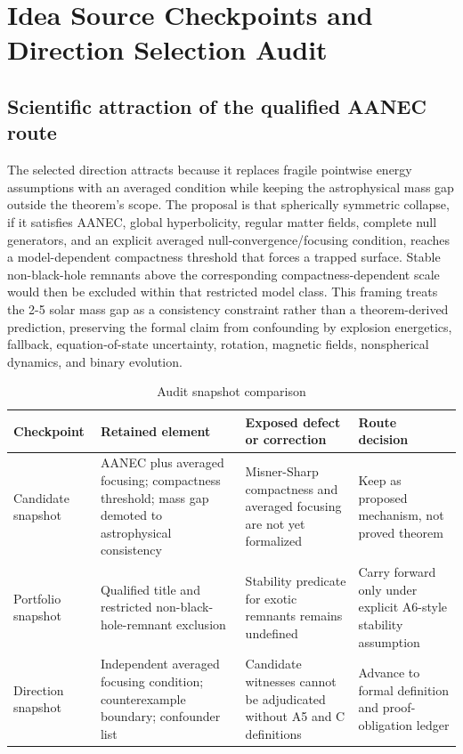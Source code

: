 \documentclass[conference]{IEEEtran}
\begin{document}
\section{Idea Source Checkpoints and Direction Selection Audit}
\subsection{Scientific attraction of the qualified AANEC route}
The selected direction attracts because it replaces fragile pointwise energy assumptions with an averaged condition while keeping the astrophysical mass gap outside the theorem’s scope. The proposal is that spherically symmetric collapse, if it satisfies AANEC, global hyperbolicity, regular matter fields, complete null generators, and an explicit averaged null-convergence/focusing condition, reaches a model-dependent compactness threshold that forces a trapped surface. Stable non-black-hole remnants above the corresponding compactness-dependent scale would then be excluded within that restricted model class. This framing treats the 2-5 solar mass gap as a consistency constraint rather than a theorem-derived prediction, preserving the formal claim from confounding by explosion energetics, fallback, equation-of-state uncertainty, rotation, magnetic fields, nonspherical dynamics, and binary evolution.

\begin{table}[htbp]
\centering
\footnotesize
\setlength{\tabcolsep}{3pt}
\renewcommand{\arraystretch}{1.12}
\caption{Audit snapshot comparison}
\label{tab:idea-origin-and-selection-checkpoint-audit-table}
\begin{tabular}{|p{}|p{}|p{}|p{}|}
\hline
Checkpoint & Retained element & Exposed defect or correction & Route decision \\\hline
Candidate snapshot & AANEC plus averaged focusing; compactness threshold; mass gap demoted to astrophysical consistency & Misner-Sharp compactness and averaged focusing are not yet formalized & Keep as proposed mechanism, not proved theorem \\\hline
Portfolio snapshot & Qualified title and restricted non-black-hole-remnant exclusion & Stability predicate for exotic remnants remains undefined & Carry forward only under explicit A6-style stability assumption \\\hline
Direction snapshot & Independent averaged focusing condition; counterexample boundary; confounder list & Candidate witnesses cannot be adjudicated without A5 and C definitions & Advance to formal definition and proof-obligation ledger \\\hline
\end{tabular}
\end{table}
\end{document}
